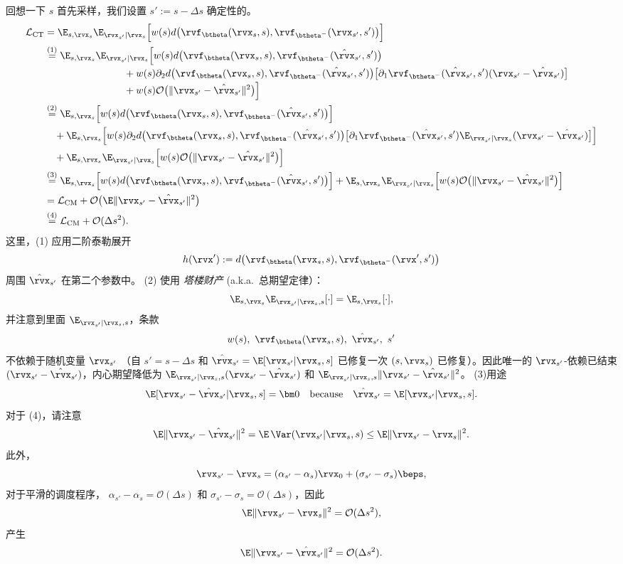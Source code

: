 回想一下 $s$ 首先采样，我们设置 $s':=s-\Delta s$ 确定性的。
\begin{align*}
\mathcal{L}_{\mathrm{CT}}
&= \E_{s,\rvx_s}\E_{\rvx_{s'}|\rvx_s} \Big[w(s) d\big(\rvf_{\btheta}(\rvx_s,s), \rvf_{\btheta^-}(\rvx_{s'},s')\big)\Big]
\\
&\overset{\text{(1)}}{=} \E_{s,\rvx_s}\E_{\rvx_{s'}|\rvx_s} \Big[
w(s) d\big(\rvf_{\btheta}(\rvx_s,s), \rvf_{\btheta^-}(\hat\rvx_{s'},s')\big)
\\[-2pt]
&\qquad\qquad\qquad\qquad
+ w(s) \partial_2 d\big(\rvf_{\btheta}(\rvx_s,s),\rvf_{\btheta^-}(\hat\rvx_{s'},s')\big)\big[\partial_1\rvf_{\btheta^-}(\hat\rvx_{s'},s')(\rvx_{s'}-\hat\rvx_{s'})\big]
\\[-2pt]
&\qquad\qquad\qquad\qquad
+ w(s) \mathcal O \big(\|\rvx_{s'}-\hat\rvx_{s'}\|^2\big)\Big]
\\
&\overset{\text{(2)}}{=} \E_{s,\rvx_s} \Big[w(s) d\big(\rvf_{\btheta}(\rvx_s,s), \rvf_{\btheta^-}(\hat\rvx_{s'},s')\big)\Big]
\\
&\quad+ \E_{s,\rvx_s} \Big[w(s) \partial_2 d\big(\rvf_{\btheta}(\rvx_s,s),\rvf_{\btheta^-}(\hat\rvx_{s'},s')\big)\big[\partial_1\rvf_{\btheta^-}(\hat\rvx_{s'},s') \E_{\rvx_{s'}|\rvx_s}(\rvx_{s'}-\hat\rvx_{s'})\big]\Big]
\\
&\quad+ \E_{s,\rvx_s}\E_{\rvx_{s'}|\rvx_s} \Big[w(s) \mathcal{O} \big(\|\rvx_{s'}-\hat\rvx_{s'}\|^2\big)\Big]
\\
&\overset{\text{(3)}}{=} \E_{s,\rvx_s} \Big[w(s) d\big(\rvf_{\btheta}(\rvx_s,s), \rvf_{\btheta^-}(\hat\rvx_{s'},s')\big)\Big]
+ \E_{s,\rvx_s}\E_{\rvx_{s'}|\rvx_s} \Big[w(s) \mathcal{O} \big(\|\rvx_{s'}-\hat\rvx_{s'}\|^2\big)\Big]
\\
&= \mathcal{L}_{\mathrm{CM}}
+ \mathcal{O} \big(\E\|\rvx_{s'}-\hat\rvx_{s'}\|^2\big)
\\
&\overset{\text{(4)}}{=} \mathcal{L}_{\mathrm{CM}} + \mathcal{O}(\Delta s^2).
\end{align*}
这里，(1) 应用二阶泰勒展开
\[
h(\rvx') := d\big(\rvf_{\btheta}(\rvx_s,s), \rvf_{\btheta^-}(\rvx',s')\big)
\]
周围 $\hat\rvx_{s'}$ 在第二个参数中。 (2) 使用 \textit{塔楼财产} (a.k.a.\ 总期望定律）：
\[
\E_{s,\rvx_s}\E_{\rvx_{s'}|\rvx_s,s}[\cdot]
=\E_{s,\rvx_s}[\cdot],
\]
并注意到里面 $\E_{\rvx_{s'}|\rvx_s,s}$，条款
\[
w(s),\ \rvf_{\btheta}(\rvx_s,s),\ \hat\rvx_{s'},\ s'
\]
不依赖于随机变量 $\rvx_{s'}$ （自 $s' = s-\Delta s$ 和 $\hat\rvx_{s'}=\E[\rvx_{s'}|\rvx_s,s]$ 已修复一次 $(s,\rvx_s)$ 已修复）。因此唯一的 $\rvx_{s'}$-依赖已结束 $(\rvx_{s'}-\hat\rvx_{s'})$，内心期望降低为
$\E_{\rvx_{s'}|\rvx_s,s}(\rvx_{s'}-\hat\rvx_{s'})$ 和
$\E_{\rvx_{s'}|\rvx_s,s}\|\rvx_{s'}-\hat\rvx_{s'}\|^2$。 (3)用途
\[
\E[\rvx_{s'}-\hat\rvx_{s'}|\rvx_s,s]=\bm 0
\quad\text{because}\quad
\hat\rvx_{s'}=\E[\rvx_{s'}|\rvx_s,s].
\]
对于 (4)，请注意
\[
\E\|\rvx_{s'}-\hat\rvx_{s'}\|^2
=\E\,\Var(\rvx_{s'}|\rvx_s,s)
\le \E\|\rvx_{s'}-\rvx_s\|^2.
\]
此外，
\[
\rvx_{s'}-\rvx_s=(\alpha_{s'}-\alpha_s)\rvx_0+(\sigma_{s'}-\sigma_s)\beps,
\]
对于平滑的调度程序， $\alpha_{s'}-\alpha_s=\mathcal{O}(\Delta s)$ 和
$\sigma_{s'}-\sigma_s=\mathcal{O}(\Delta s)$，因此
\[
\E\|\rvx_{s'}-\rvx_s\|^2=\mathcal{O}(\Delta s^2),
\]
产生
\[
\E\|\rvx_{s'}-\hat\rvx_{s'}\|^2=\mathcal{O}(\Delta s^2).
\]


